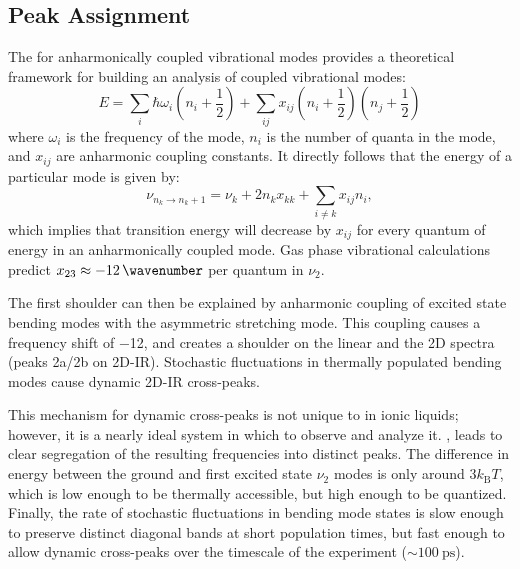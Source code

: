 \documentclass[%
  class = book,%
  crop = false,%
  float = true,%
  multi = true,%
  preview = false,%
]{standalone}
\let\cite\autocite
\begin{document}
{\subsection{Peak Assignment}
\label{sec:nu3_assignment}
The   for anharmonically coupled vibrational modes provides a theoretical framework for building an analysis of coupled vibrational modes:
\begin{equation}
  \label{eq:Dunham expansion}
  E = \sum_{i} \hbar \omega_i \left( n_i + \frac{1}{2} \right) + \sum_{ij} x_{ij} \left( n_i + \frac{1}{2} \right) \left( n_j + \frac{1}{2} \right)
\end{equation}
 where \(\omega_{i}\) is the frequency of the mode, \(n_{i}\) is the number of quanta in the mode, and \(x_{ij}\) are anharmonic coupling constants. It directly follows that the energy of a particular mode is given by:
\begin{equation}
  \label{eq:anh_coupled_energy}
  \nu_{n_k \rightarrow n_k + 1} = \nu_k + 2n_{k}x_{kk} + \sum_{i \neq k} x_{ij}n_{i},
\end{equation}
 which implies that transition energy will decrease by \(x_{ij}\) for every quantum of energy in an anharmonically coupled mode.\cite{Botan2008} Gas phase vibrational calculations predict \(x_{23} \approx \SI{-12}{\wavenumber}\) per quantum in \(\nu_2\).\cite{Taylor1993,Dressier1997}

The first shoulder can then be explained by anharmonic coupling of excited state bending modes with the asymmetric stretching mode. This coupling causes a frequency shift of \SI{-12}{\wavenumber}, and creates a shoulder on the linear and the 2D spectra (peaks 2a/2b on 2D-IR). Stochastic fluctuations in thermally populated bending modes cause dynamic 2D-IR cross-peaks.

This mechanism for dynamic cross-peaks is not unique to  in ionic liquids; however, it is a nearly ideal system in which to observe and analyze it. , leads to clear segregation of the resulting frequencies into distinct peaks. The difference in energy between the ground and first excited state \(\nu_2\) modes is only around \(3k_{\mathrm{B}}T\), which is low enough to be thermally accessible, but high enough to be quantized. Finally, the rate of stochastic fluctuations in bending mode states is slow enough to preserve distinct diagonal bands at short population times, but fast enough to allow dynamic cross-peaks over the timescale of the experiment (\(\sim \SI{100}{\ps}\)).

}
\end{document}
